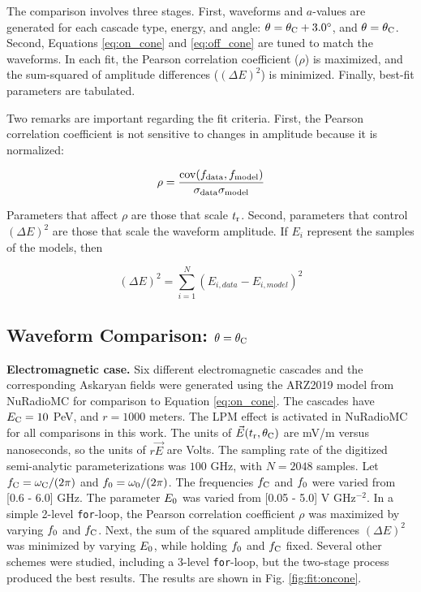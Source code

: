 \documentclass[amsmath,amssymb,aps,prd,10pt,twocolumn]{revtex4}
\DeclareMathOperator\cov{cov}
\begin{document}
The comparison involves three stages.  First, waveforms and $a$-values are generated for each cascade type, energy, and angle: $\theta = \theta_{\rm C} + 3.0^{\circ}$, and $\theta = \theta_{\rm C}$.  Second, Equations \ref{eq:on_cone} and \ref{eq:off_cone} are tuned to match the waveforms.  In each fit, the Pearson correlation coefficient ($\rho$) is maximized, and the sum-squared of amplitude differences ($(\Delta E)^2$) is minimized.  Finally, best-fit parameters are tabulated. 

Two remarks are important regarding the fit criteria.  First, the Pearson correlation coefficient is not sensitive to changes in amplitude because it is normalized:

\begin{equation}
\rho = \frac{\cov(f_{\rm data},f_{\rm model})}{\sigma_{\rm data} \sigma_{\rm model}}
\end{equation}

Parameters that affect $\rho$ are those that scale $t_{\rm r}$.  Second, parameters that control $(\Delta E)^2$ are those that scale the waveform amplitude.  If $E_i$ represent the samples of the models, then

\begin{equation}
(\Delta E)^2 = \sum_{i = 1}^{N} (E_{i,data} - E_{i,model})^2
\end{equation}

\subsection{Waveform Comparison: $\theta = \theta_{\rm C}$}
\label{sec:fit:on}

\textbf{Electromagnetic case.}  Six different electromagnetic cascades and the corresponding Askaryan fields were generated using the ARZ2019 model from NuRadioMC \cite{10.1140/epjc/s10052-020-7612-8} \cite{PhysRevD.101.083005} for comparison to Equation \ref{eq:on_cone}.  The cascades have $E_{\rm C} = 10$ PeV, and $r = 1000$ meters.  The LPM effect is activated in NuRadioMC for all comparisons in this work.  The units of $\vec{E}(t_{\rm r},\theta_{\rm C})$ are mV/m versus nanoseconds, so the units of $r\vec{E}$ are Volts.  The sampling rate of the digitized semi-analytic parameterizations was $100$ GHz, with $N = 2048$ samples.  Let $f_{\rm C} = \omega_{\rm C}/(2\pi)$ and $f_{\rm 0} = \omega_{\rm 0}/(2\pi)$.  The frequencies $f_{\rm C}$ and $f_{\rm 0}$ were varied from [0.6 - 6.0] GHz.  The parameter $E_{\rm 0}$ was varied from [0.05 - 5.0] V GHz$^{-2}$.  In a simple 2-level \verb+for+-loop, the Pearson correlation coefficient $\rho$ was maximized by varying $f_{\rm 0}$ and $f_{\rm C}$.  Next, the sum of the squared amplitude differences $(\Delta E)^2$ was minimized by varying $E_{\rm 0}$, while holding $f_{\rm 0}$ and $f_{\rm C}$ fixed.  Several other schemes were studied, including a 3-level \verb+for+-loop, but the two-stage process produced the best results. The results are shown in Fig. \ref{fig:fit:oncone}.
\end{document}
